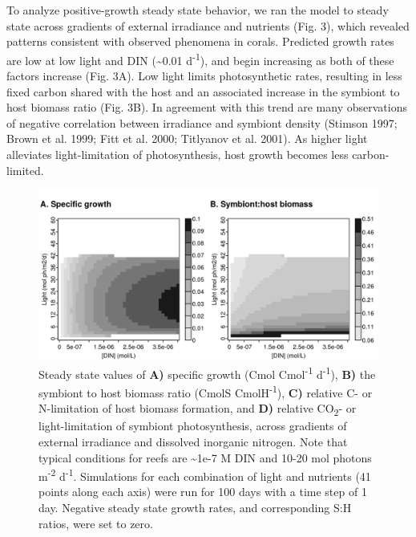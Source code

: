 \documentclass[]{elsarticle} %
\makeatletter
\def\maxwidth{\ifdim\Gin@nat@width>\linewidth\linewidth
\else\Gin@nat@width\fi}
\let\Oldincludegraphics\includegraphics
\renewcommand{\includegraphics}[1]{\Oldincludegraphics[width=\maxwidth]{#1}}
\makeatother
\begin{document}
To analyze positive-growth steady state behavior, we ran the model to
steady state across gradients of external irradiance and nutrients (Fig.
3), which revealed patterns consistent with observed phenomena in
corals. Predicted growth rates are low at low light and DIN
(\textasciitilde{}0.01 d\textsuperscript{-1}), and begin increasing as
both of these factors increase (Fig. 3A). Low light limits
photosynthetic rates, resulting in less fixed carbon shared with the
host and an associated increase in the symbiont to host biomass ratio
(Fig. 3B). In agreement with this trend are many observations of
negative correlation between irradiance and symbiont density (Stimson
1997; Brown et al. 1999; Fitt et al. 2000; Titlyanov et al. 2001). As
higher light alleviates light-limitation of photosynthesis, host growth
becomes less carbon-limited.

\begin{figure}[htbp]
\centering
\includegraphics{../img/Fig3.png}
\caption{Steady state values of \textbf{A)} specific growth (Cmol
Cmol\textsuperscript{-1} d\textsuperscript{-1}), \textbf{B)} the
symbiont to host biomass ratio (CmolS CmolH\textsuperscript{-1}),
\textbf{C)} relative C- or N-limitation of host biomass formation, and
\textbf{D)} relative CO\textsubscript{2}- or light-limitation of
symbiont photosynthesis, across gradients of external irradiance and
dissolved inorganic nitrogen. Note that typical conditions for reefs are
\textasciitilde{}1e-7 M DIN and 10-20 mol photons m\textsuperscript{-2}
d\textsuperscript{-1}. Simulations for each combination of light and
nutrients (41 points along each axis) were run for 100 days with a time
step of 1 day. Negative steady state growth rates, and corresponding S:H
ratios, were set to zero.}
\end{figure}
\end{document}
